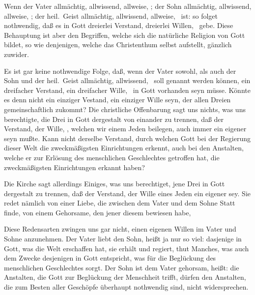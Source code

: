  Wenn der Vater allmächtig, allwissend, allweise, \usw ; der Sohn allmächtig, allwissend, allweise, \usw ; der heil.\ Geist allmächtig, allwissend, allweise, \usw\ ist: so folget nothwendig, daß es in Gott dreierlei Verstand, dreierlei Willen, \usw\ gebe. Diese Behauptung ist aber den Begriffen, welche sich die natürliche Religion von Gott bildet, so wie denjenigen, welche das Christenthum selbst aufstellt, gänzlich zuwider.\par
{} Es ist gar keine nothwendige Folge, daß, wenn der Vater sowohl, als auch der Sohn und der heil.\ Geist allmächtig, allwissend, \usw\  soll genannt werden können, ein dreifacher Verstand, ein dreifacher Wille, \usw\ in Gott vorhanden seyn müsse. Könnte es denn nicht ein einziger Vestand, ein einziger Wille seyn, der allen Dreien gemeinschaftlich zukommt? Die christliche Offenbarung sagt uns nichts, was uns berechtigte, die Drei in Gott dergestalt von einander zu trennen, daß der Verstand, der Wille, \usw , welchen wir einem Jeden beilegen, auch immer ein eigener seyn mußte. Kann nicht derselbe Verstand, durch welchen Gott bei der Regierung dieser Welt die zweckmäßigsten Einrichtungen erkennt, auch bei den Anstalten, welche er zur Erlösung des menschlichen Geschlechtes getroffen hat, die zweckmäßigsten Einrichtungen erkannt haben? \usw\par
{} Die Kirche sagt allerdings Einiges, was uns berechtiget, jene Drei in Gott dergestalt zu trennen, daß der Verstand, der Wille eines Jeden ein eigener sey. Sie redet nämlich von einer Liebe, die zwischen dem Vater und dem Sohne Statt finde, von einem Gehorsame, den jener diesem bewiesen habe, \usw\par
{} Diese Redensarten zwingen uns gar nicht, einen eigenen Willen im Vater und Sohne anzunehmen. Der Vater liebt den Sohn, heißt ja nur so viel: dasjenige in Gott, was die Welt erschaffen hat, sie erhält und regiert, thut Manches, was auch dem Zwecke desjenigen in Gott entspricht, was für die Beglückung des menschlichen Geschlechtes sorgt. Der Sohn ist dem Vater gehorsam, heißt: die Anstalten, die Gott zur Beglückung der Menschheit trifft, dürfen den Anstalten, die zum Besten aller Geschöpfe überhaupt nothwendig sind, nicht widersprechen.

